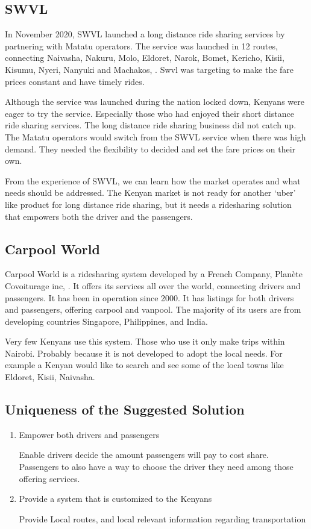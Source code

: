 \subsection{SWVL}
In November 2020, SWVL launched a long distance ride sharing services by partnering with Matatu operators. The service was launched  in 12 routes, connecting Naivasha, Nakuru, Molo, Eldoret, Narok, Bomet, Kericho, Kisii, Kisumu, Nyeri, Nanyuki and Machakos, \citep{alvin2020}. Swvl was targeting to make the fare prices constant and have timely rides.

Although the service was launched during the nation locked down, Kenyans were eager to try the service. Especially those who had enjoyed their short distance ride sharing services. The long distance ride sharing business did not catch up. The Matatu operators would switch from the SWVL service when there was high demand. They needed the flexibility to decided and set the fare prices on their own.

From the experience of SWVL, we can learn how the market operates and what needs should be addressed. The Kenyan market is not ready for another `uber' like product for long distance ride sharing, but it needs a ridesharing solution that empowers both the driver and the passengers.

\subsection{Carpool World}

Carpool World is a ridesharing system developed by a French Company, Planète Covoiturage inc, \citep{carpoolworld}. It offers its services all over the world, connecting drivers and passengers. It has been in operation since 2000. It has listings for both drivers and passengers, offering carpool and vanpool. The majority of its users are from developing countries Singapore, Philippines, and India.

Very few Kenyans use this system. Those who use it only make trips within Nairobi. Probably because it is not developed to adopt the local needs. For example a Kenyan would like to search and see some of the local towns like Eldoret, Kisii, Naivasha.

\subsection{Uniqueness of the Suggested Solution}

\begin{enumerate}
    \item Empower both drivers and passengers

          Enable drivers decide the amount passengers will pay to cost share.
          Passengers to also have a way to choose the driver they need among those offering services.

    \item  Provide a system that is customized to the Kenyans

          Provide Local routes, and local relevant information regarding transportation
\end{enumerate}

